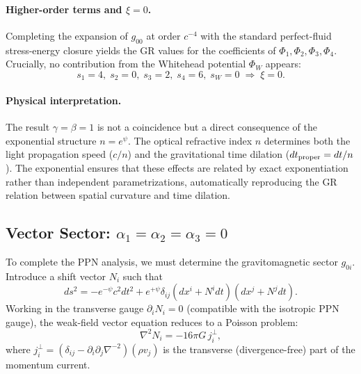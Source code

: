 \paragraph{Higher-order terms and $\xi = 0$.}
Completing the expansion of $g_{00}$ at order $c^{-4}$ with the standard perfect-fluid stress-energy closure yields the GR values for the coefficients of $\Phi_1, \Phi_2, \Phi_3, \Phi_4$. Crucially, no contribution from the Whitehead potential $\Phi_W$ appears:
\begin{equation}
s_1 = 4, \; s_2 = 0, \; s_3 = 2, \; s_4 = 6, \; s_W = 0 \;\Rightarrow\; \boxed{\xi = 0}.
\end{equation}

\paragraph{Physical interpretation.}
The result $\gamma = \beta = 1$ is not a coincidence but a direct consequence of the exponential structure $n = e^{\psi}$. The optical refractive index $n$ determines both the light propagation speed ($c/n$) and the gravitational time dilation ($dt_{\rm proper} = dt/n$). The exponential ensures that these effects are related by exact exponentiation rather than independent parametrizations, automatically reproducing the GR relation between spatial curvature and time dilation.

\subsection{Vector Sector: \texorpdfstring{$\alpha_1 = \alpha_2 = \alpha_3 = 0$}{alphas = 0}}\label{sec:ppn-vector}

To complete the PPN analysis, we must determine the gravitomagnetic sector $g_{0i}$. Introduce a shift vector $N_i$ such that
\begin{equation}
ds^2 = -e^{-\psi}c^2 dt^2 + e^{+\psi}\delta_{ij}(dx^i + N^i dt)(dx^j + N^j dt).
\end{equation}
Working in the transverse gauge $\partial_i N_i = 0$ (compatible with the isotropic PPN gauge), the weak-field vector equation reduces to a Poisson problem:
\begin{equation}
\nabla^2 N_i = -16\pi G\, j_i^{\perp},
\end{equation}
where $j_i^{\perp} = (\delta_{ij} - \partial_i \partial_j \nabla^{-2})(\rho v_j)$ is the transverse (divergence-free) part of the momentum current.

